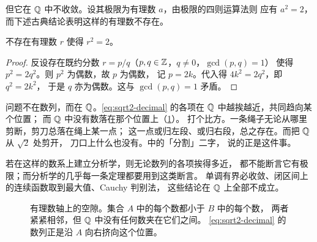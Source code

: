 但它在 \(\mathbb{Q}\) 中不收敛。设其极限为有理数 \(a\)，由极限的四则运算法则
应有 \(a^{2} = 2\)，而下述古典结论表明这样的有理数不存在。

\begin{proposition}
  \label{prop:sqrt2-irrational}
  不存在有理数 \(r\) 使得 \(r^{2} = 2\)。
\end{proposition}

\begin{proof}
  反设存在既约分数 \(r = p/q\)（\(p, q \in \mathbb{Z}\)，\(q \neq 0\)，\(\gcd(p,q)=1\)）
  使得 \(p^{2} = 2q^{2}\)。则 \(p^{2}\) 为偶数，故 \(p\) 为偶数，
  记 \(p = 2k\)。代入得 \(4k^{2} = 2q^{2}\)，即 \(q^{2} = 2k^{2}\)，
  于是 \(q\) 亦为偶数。这与 \(\gcd(p,q) = 1\) 矛盾。
\end{proof}

问题不在数列，而在 \(\mathbb{Q}\)。\cref{eq:sqrt2-decimal} 的各项在 \(\mathbb{Q}\) 中越挨越近，共同趋向某个位置；
而 \(\mathbb{Q}\) 中没有数落在那个位置上（\cref{fig:q-gap}）。
打个比方。一条绳子无论从哪里剪断，剪刀总落在绳上某一点；
这一点或归左段、或归右段，总之存在。而把 \(\mathbb{Q}\) 从 \(\sqrt{2}\) 处剪开，
刀口上什么也没有。中的「分割」二字，
说的正是这件事。

若在这样的数系上建立分析学，则无论数列的各项挨得多近，
都不能断言它有极限；而分析学的几乎每一条定理都要用到这类断言。
单调有界必收敛、闭区间上的连续函数取到最大值、Cauchy 判别法，
这些结论在 \(\mathbb{Q}\) 上全部不成立。

\begin{figure}[htbp]
  \centering
  \caption{有理数轴上的空隙。集合 \(A\) 中的每个数都小于 \(B\) 中的每个数，
    两者紧紧相邻，但 \(\mathbb{Q}\) 中没有任何数夹在它们之间。
    \cref{eq:sqrt2-decimal} 的数列正是沿 \(A\) 向右挤向这个位置。}
  \label{fig:q-gap}
\end{figure}

